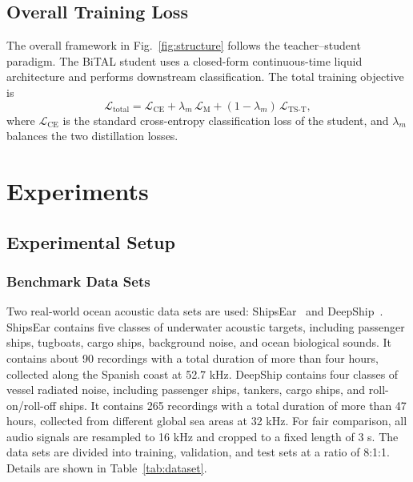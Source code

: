 ﻿\documentclass[lettersize,journal]{IEEEtran}
\begin{document}
\subsection{Overall Training Loss}
\label{subsec:total_loss}
The overall framework in Fig.~\ref{fig:structure} follows the teacher--student paradigm. The BiTAL student uses a closed-form continuous-time liquid architecture and performs downstream classification. The total training objective is
\begin{equation}
\mathcal{L}_{\mathrm{total}}
= \mathcal{L}_{\mathrm{CE}}
+ \lambda_m \, \mathcal{L}_{\mathrm{M}}
+ (1 - \lambda_m) \, \mathcal{L}_{\mathrm{TS\mbox{-}T}},
\end{equation}
where $\mathcal{L}_{\mathrm{CE}}$ is the standard cross-entropy classification loss of the student, and $\lambda_m$ balances the two distillation losses.

\section{Experiments}
\subsection{Experimental Setup}
\subsubsection{Benchmark Data Sets}
Two real-world ocean acoustic data sets are used: ShipsEar~\cite{David2016ShipsEar} and DeepShip~\cite{Irfan2021DeepShip}. ShipsEar contains five classes of underwater acoustic targets, including passenger ships, tugboats, cargo ships, background noise, and ocean biological sounds. It contains about 90 recordings with a total duration of more than four hours, collected along the Spanish coast at 52.7 kHz. DeepShip contains four classes of vessel radiated noise, including passenger ships, tankers, cargo ships, and roll-on/roll-off ships. It contains 265 recordings with a total duration of more than 47 hours, collected from different global sea areas at 32 kHz. For fair comparison, all audio signals are resampled to 16 kHz and cropped to a fixed length of 3 s. The data sets are divided into training, validation, and test sets at a ratio of 8:1:1. Details are shown in Table~\ref{tab:dataset}.
\end{document}
